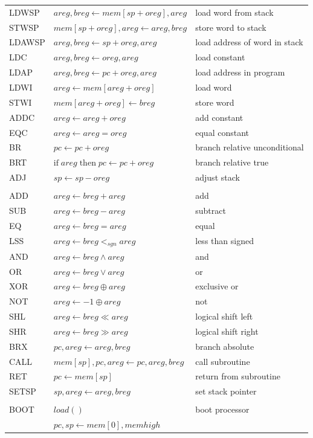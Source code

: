 \documentclass[a4paper, 12pt]{article}
\begin{document}
\begin{tabular}{lll}
LDWSP & $areg, breg \leftarrow mem[sp + oreg], areg$& load word from stack \\ 
STWSP & $mem[sp + oreg], areg \leftarrow areg, breg $& store word to stack  \\
LDAWSP & $areg, breg \leftarrow sp + oreg, areg $& load address of word in stack  \\
LDC  & $areg, breg \leftarrow oreg, areg $& load constant  \\
LDAP & $areg, breg \leftarrow pc + oreg, areg $& load address in program  \\
LDWI  & $areg \leftarrow mem[areg + oreg]$& load word  \\
STWI  & $mem[areg + oreg] \leftarrow breg$& store word   \\
ADDC & $ areg \leftarrow areg + oreg $ & add constant\\  
EQC & $ areg \leftarrow areg = oreg $ & equal constant \\  
BR   & $ pc \leftarrow pc + oreg $ & branch relative unconditional \\
BRT& $\mathrm{if}\; areg \;\mathrm{then}\; pc \leftarrow pc + oreg $ &branch relative true\\
ADJ & $sp \leftarrow sp - oreg $& adjust stack\\
&&\\
ADD & $ areg \leftarrow breg + areg $ & add \\  
SUB & $ areg  \leftarrow breg - areg $ & subtract \\  
EQ & $ areg \leftarrow breg = areg  $ & equal \\  
LSS & $ areg  \leftarrow breg  <_{sgn} areg $ & less than signed \\  
AND & $ areg \leftarrow breg \wedge areg $ & and \\  
OR  & $ areg \leftarrow breg  \vee areg $ & or \\  
XOR & $ areg \leftarrow breg \oplus areg $& exclusive or \\
NOT & $ areg  \leftarrow -1 \oplus areg $& not\\
SHL & $ areg \leftarrow breg \ll areg $ & logical shift left \\  
SHR & $ areg \leftarrow breg \gg areg $ & logical shift right  \\  
BRX & $pc, areg \leftarrow areg, breg$ &branch absolute\\
CALL & $mem[sp], pc, areg \leftarrow pc, areg, breg $ &call subroutine\\
RET   &  $pc \leftarrow mem[sp] $ & return from subroutine\\
SETSP & $sp, areg  \leftarrow areg, breg $& set stack pointer \\
&&\\             
BOOT  &$ load()$& boot processor \\
                &$ pc, sp \leftarrow mem[0], memhigh$ \\
\end{tabular}
\end{document}
